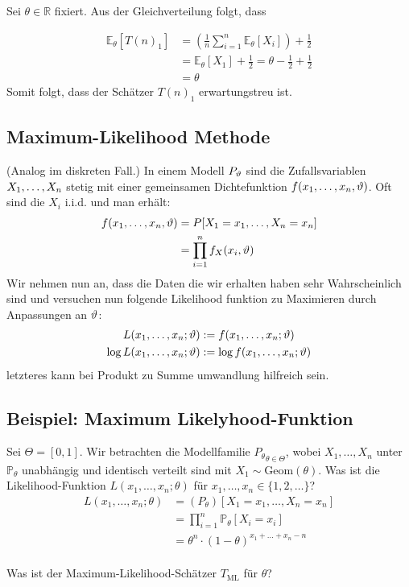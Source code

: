 Sei $\theta \in \mathbb{R}$ fixiert. Aus der Gleichverteilung folgt, dass

\begin{align*}
  \mathbb{E}_{\theta}[{T(n)}_1] &= \left(\frac{1}{n} \sum_{i=1}^{n} \mathbb{E}_{\theta}[X_i]\right) + \frac{1}{2} \\
                                &= \mathbb{E}_{\theta}[X_1] + \frac{1}{2} = \theta - \frac{1}{2} + \frac{1}{2} \\
                                &= \theta
\end{align*}
Somit folgt, dass der Schätzer ${T(n)}_1$ erwartungstreu ist.

\BoxEnd{}
\subsection*{Maximum-Likelihood Methode}
(Analog im diskreten Fall.) In einem Modell $P_\vartheta$ sind die Zufallsvariablen
$X_1, \dots, X_n$ stetig mit einer gemeinsamen Dichtefunktion
$f (x_1, \dots, x_n, \vartheta)$. Oft sind die $X_i$ i.i.d. und man erhält:
\begin{align*}
  f (x_1, \dots, x_n, \vartheta) & = P[X_1 = x_1, \dots, X_n = x_n] \\
                           & = \prod_{i = 1}^n f_X (x_i, \vartheta)
\end{align*}
Wir nehmen nun an, dass die Daten die wir erhalten haben sehr
Wahrscheinlich sind und versuchen nun folgende Likelihood funktion
zu Maximieren durch Anpassungen an $\vartheta$:
\begin{align*}
  L (x_1, \dots, x_n; \vartheta)      & := f (x_1, \dots, x_n; \vartheta)      \\
  \log L (x_1, \dots, x_n; \vartheta) & := \log f (x_1, \dots, x_n; \vartheta)
\end{align*}
letzteres kann bei Produkt zu Summe umwandlung hilfreich sein.
\BoxStart{}
\subsection*{Beispiel: Maximum Likelyhood-Funktion}
Sei $\Theta = [0, 1]$. Wir betrachten die Modellfamilie $ {P_\theta}_{\theta \in \Theta}$, wobei $X_1, \ldots, X_n$ unter $\mathbb{P}_\theta$ unabhängig und identisch verteilt sind mit $X_1 \sim \text{Geom} (\theta)$. Was ist die Likelihood-Funktion $L (x_1, \ldots, x_n; \theta)$ für $x_1, \ldots, x_n \in \{1, 2, \ldots\}$?
\begin{align*}
  L (x_1, \ldots, x_n; \theta) & =  (P_\theta) [X_1 = x_1,\ldots , X_n = x_n]            \\
                               & =\prod_{i = 1}^n \mathbb{P}_\theta[X_i = x_i]           \\
                               & = \theta^n \cdot  {(1 - \theta)}^{x_1 + \ldots + x_n - n}
\end{align*}
\\
Was ist der Maximum-Likelihood-Schätzer $T_{\text{ML}}$ für $\theta$?


